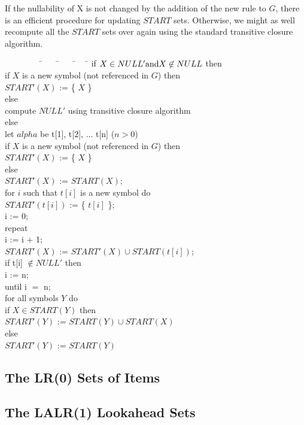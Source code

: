 If the nullability of X is not changed by the addition of the new
rule to $G$, there is an efficient procedure for updating $START$ sets.
Otherwise, we might as well recompute all the $START$ sets over again
using the standard transitive closure algorithm.
\begin{tabbing}
\ \ \ \ \ \ \ \ \=\ \ \ \ \=\ \ \ \ \=\ \ \ \ \= \kill
\>       if $X \in NULL' {\rm and} X \not\in NULL$ then\\
\>\>         if $X$ is a new symbol (not referenced in $G$) then\\
\>\>\>           $START'(X)$ := \{ $X$ \}\\
\>\>         else\\
\>\>\>           compute $NULL'$ using transitive closure algorithm\\
\>       else\\
\>\>         let $alpha$ be t[1], t[2], ... t[n] ($n > 0$)\\
\>\>         if $X$ is a new symbol (not referenced in $G$) then\\
\>\>\>           $START'(X)$ := \{ $X$ \}\\
\>\>         else\\
\>\>            $START'(X)$ := $START(X)$;\\
\>\>         for $i$ such that $t[i]$ is a new symbol do\\
\>\>\>           $START'( t[i] )$ := \{ $t[i]$ \};\\
\>\>         i := 0;\\
\>\>         repeat\\
\>\>\>          i := i + 1;\\
\>\>\>          $START'(X)$ := $START'(X) \cup START( t[i] )$;\\
\>\>\>          if t[i] $\not\in NULL'$ then\\
\>\>\>\>            i := n;\\
\>\>         until i $=$ n;\\
\>\>         for all symbols $Y$ do\\
\>\>\>          if $X \in START(Y)$ then\\
\>\>\>\>           $START'(Y)$ := $START(Y) \cup START(X)$\\
\>\>\>          else\\
\>\>\>\>           $START'(Y)$ := $START(Y)$
\end{tabbing}

\subsection{The LR(0) Sets of Items}

\subsection{The LALR(1) Lookahead Sets}


